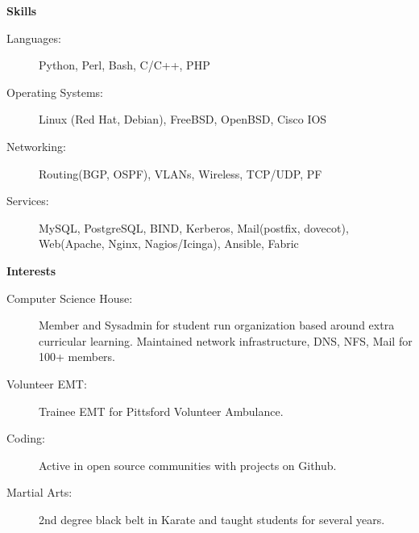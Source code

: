 \documentclass[letterpaper,11pt]{article}
\newcommand{\resheading}[1]{{\large \colorbox{mygrey}{\begin{minipage}{\textwidth}{\textbf{#1 \vphantom{p\^{E}}}}\end{minipage}}}}
\begin{document}
\resheading{Skills}

\begin{description}
\item[Languages:]
Python, Perl, Bash, C/C++, PHP
\item[Operating Systems:]
Linux (Red Hat, Debian), FreeBSD, OpenBSD, Cisco IOS
\item[Networking:]Routing(BGP, OSPF), VLANs, Wireless, TCP/UDP, PF
\item[Services:]MySQL, PostgreSQL, BIND, Kerberos, Mail(postfix, dovecot), Web(Apache, Nginx, Nagios/Icinga), Ansible, Fabric
\end{description}

\resheading{Interests}

\begin{description}
\item[Computer Science House:] Member and Sysadmin for student run organization based around extra curricular learning. Maintained network infrastructure, DNS, NFS, Mail for 100+ members.
\item[Volunteer EMT:]Trainee EMT for Pittsford Volunteer Ambulance.  
\item[Coding:] Active in open source communities with projects on Github. 
\item[Martial Arts:] 2nd degree black belt in Karate and taught students for several years.

\end{description}
\end{document}
